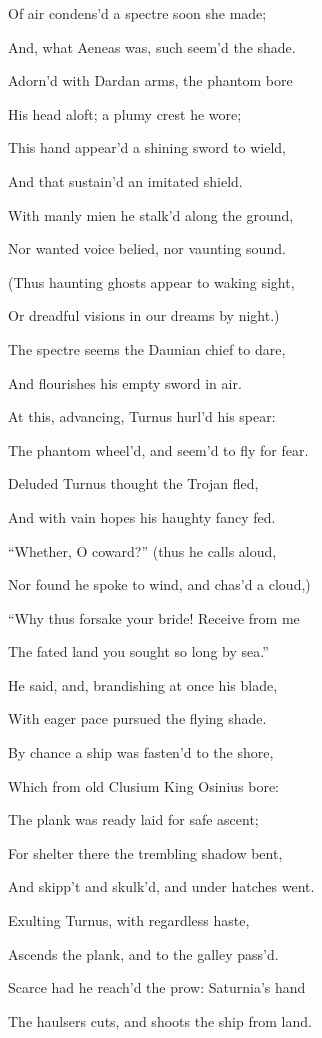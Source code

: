 Of air condens’d a spectre soon she made;

And, what Aeneas was, such seem’d the shade.

Adorn’d with Dardan arms, the phantom bore

His head aloft; a plumy crest he wore;

This hand appear’d a shining sword to wield,

And that sustain’d an imitated shield.

With manly mien he stalk’d along the ground,

Nor wanted voice belied, nor vaunting sound.

(Thus haunting ghosts appear to waking sight,

Or dreadful visions in our dreams by night.)

The spectre seems the Daunian chief to dare,

And flourishes his empty sword in air.

At this, advancing, Turnus hurl’d his spear:

The phantom wheel’d, and seem’d to fly for fear.

Deluded Turnus thought the Trojan fled,

And with vain hopes his haughty fancy fed.

“Whether, O coward?” (thus he calls aloud,

Nor found he spoke to wind, and chas’d a cloud,)

“Why thus forsake your bride! Receive from me

The fated land you sought so long by sea.”

He said, and, brandishing at once his blade,

With eager pace pursued the flying shade.

By chance a ship was fasten’d to the shore,

Which from old Clusium King Osinius bore:

The plank was ready laid for safe ascent;

For shelter there the trembling shadow bent,

And skipp’t and skulk’d, and under hatches went.

Exulting Turnus, with regardless haste,

Ascends the plank, and to the galley pass’d.

Scarce had he reach’d the prow: Saturnia’s hand

The haulsers cuts, and shoots the ship from land.


